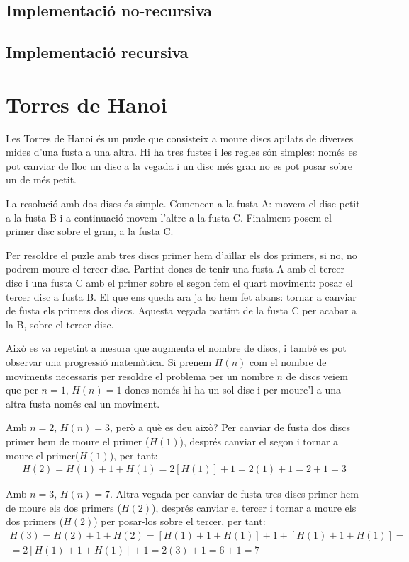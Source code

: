 \subsection{Implementació no-recursiva}


\subsection{Implementació recursiva}


\section{Torres de Hanoi}
Les Torres de Hanoi és un puzle que consisteix a moure discs apilats de diverses mides d'una fusta a una altra.
Hi ha tres fustes i les regles són simples: només es pot canviar de lloc un disc a la vegada i un disc més gran no es pot posar sobre un de més petit.

La resolució amb dos discs és simple. Comencen a la fusta A: movem el disc petit a la fusta B i a continuació movem l'altre a la fusta C. Finalment posem el primer disc sobre el gran, a la fusta C.

Per resoldre el puzle amb tres discs primer hem d'aïllar els dos primers, si no, no podrem moure el tercer disc.
Partint doncs de tenir una fusta A amb el tercer disc i una fusta C amb el primer sobre el segon fem el quart moviment: posar el tercer disc a fusta B.
El que ens queda ara ja ho hem fet abans: tornar a canviar de fusta els primers dos discs. Aquesta vegada partint de la fusta C per acabar a la B, sobre el tercer disc.

Això es va repetint a mesura que augmenta el nombre de discs, i també es pot observar una progressió matemàtica.
Si prenem $H(n)$ com el nombre de moviments necessaris per resoldre el problema per un nombre $n$ de discs veiem que per $n=1$, $H(n)=1$ doncs només hi ha un sol disc i per moure'l a una altra fusta només cal un moviment.

Amb $n=2$, $H(n)=3$, però a què es deu això? Per canviar de fusta dos discs primer hem de moure el primer ($H{(1)}$), després canviar el segon i tornar a moure el primer($H(1)$), per tant:
\begin{gather*}
	H(2) = H(1)+1+H(1) = 2[H(1)]+1 = 2(1)+1 = 2+1 = 3
\end{gather*}

Amb $n=3$, $H(n)=7$. Altra vegada per canviar de fusta tres discs primer hem de moure els dos primers ($H(2)$), després canviar el tercer i tornar a moure els dos primers ($H(2)$) per posar-los sobre el tercer, per tant:
\begin{gather*}
	H(3) = H(2)+1+H(2) = [H(1)+1+H(1)] + 1 + [H(1)+1+H(1)] = \\
	= 2[H(1)+1+H(1)] + 1 = 2(3) + 1 = 6+1 = 7
\end{gather*}

